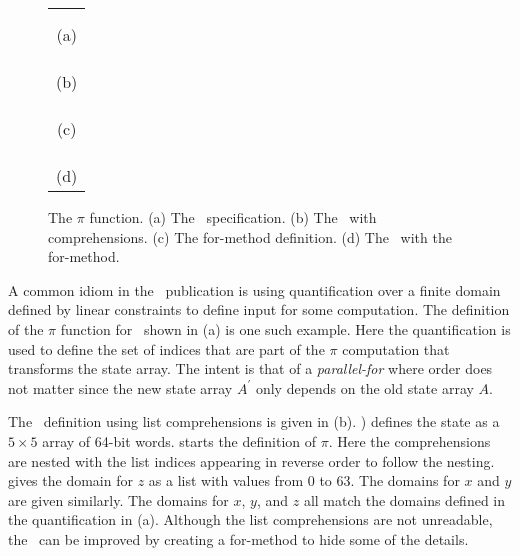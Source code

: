 \begin{figure}[t]
  \begin{center}
    \begin{tabular}{l}
      \usebox{\fipsPi} \\ \\
      \multicolumn{1}{c}{(a)} \\ \\
      \usebox{\PiCry} \\ \\
      \multicolumn{1}{c}{(b)} \\ \\
      \usebox{\formethod} \\ \\
      \multicolumn{1}{c}{(c)} \\ \\ 
      \usebox{\PiCryLib} \\ \\
      \multicolumn{1}{c}{(d)}
    \end{tabular}
  \end{center}
  \caption{The $\pi$ function. (a) The \fips\ specification. (b) The \cryptol\ with comprehensions. (c) The for-method definition. (d) The \cryptol\ with the for-method.}
  \label{fig:pi}
\end{figure}

A common idiom in the \fips\ publication is using quantification over a finite domain defined by linear constraints to define input for some computation.
The definition of the $\pi$ function for \keccak\ shown in (a) is one such example.
Here the quantification is used to define the set of indices that are part of the $\pi$ computation that transforms the state array. The intent is that of a \emph{parallel-for} where order does not matter since the new state array $A^\prime$ only depends on the old state array $A$.

The \cryptol\ definition using list comprehensions is given in (b).
) defines the state as a $5 \times 5$ array of 64-bit words.
 starts the definition of $\pi$. 
Here the comprehensions are nested with the list indices appearing in reverse order to follow the nesting.
 gives the domain for $z$ as a list with values from 0 to 63.
The domains for $x$ and $y$ are given similarly.
The domains for $x$, $y$, and $z$ all match the domains defined in the quantification in (a).
Although the list comprehensions are not unreadable, the \cryptol\ can be improved by creating a for-method to hide some of the details.

